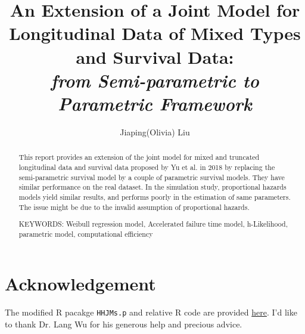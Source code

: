 \documentclass[10pt]{article}
\title{An Extension of a Joint Model for Longitudinal Data of Mixed Types and Survival Data:\\
\textit{from Semi-parametric to Parametric Framework}
}
\author{Jiaping(Olivia) Liu}
\begin{document}
\maketitle

\begin{abstract}
    This report provides an extension of the joint model for mixed and truncated longitudinal data and survival data proposed by Yu et al. in 2018 \cite{yu2018joint} by replacing the semi-parametric survival model by a couple of parametric survival models. They have similar performance on the real dataset. In the simulation study, proportional hazards models yield similar results, and performs poorly in the estimation of same parameters. The issue might be due to the invalid assumption of proportional hazards.
    
    \noindent KEYWORDS: Weibull regression model, Accelerated failure time model, h-Likelihood, parametric model, computational efficiency
\end{abstract}







\section*{Acknowledgement}

The modified R pacakge \texttt{HHJMs.p} and relative R code are provided \href{https://github.com/OliviaJL/parametric-hhjms/blob/main/README.md}{here}. I'd like to thank Dr. Lang Wu for his generous help and precious advice.

\printbibliography
\end{document}
